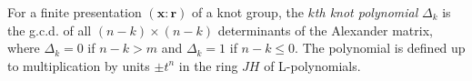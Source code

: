 For a finite presentation $(\mathbf{x} : \mathbf{r})$ of a knot group, the \textit{$k$th knot polynomial} $\Delta_k$ is the g.c.d. of all $(n-k) \times (n-k)$ determinants of the Alexander matrix, where $\Delta_k = 0$ if $n-k > m$ and $\Delta_k = 1$ if $n-k \leq 0$. The polynomial is defined up to multiplication by units $\pm t^n$ in the ring $JH$ of L-polynomials.
